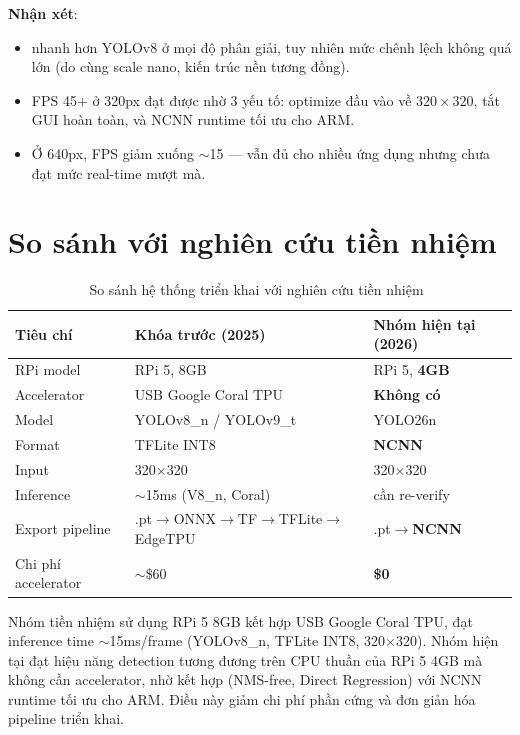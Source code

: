 \textbf{Nhận xét}: 
\begin{itemize}
    \item \yolo nhanh hơn YOLOv8 ở mọi độ phân giải, tuy nhiên mức chênh lệch không quá lớn (do cùng scale nano, kiến trúc nền tương đồng).
    \item FPS 45+ ở 320px đạt được nhờ 3 yếu tố: optimize đầu vào về $320 \times 320$, tắt GUI hoàn toàn, và NCNN runtime tối ưu cho ARM.
    \item Ở 640px, FPS giảm xuống $\sim$15 --- vẫn đủ cho nhiều ứng dụng nhưng chưa đạt mức real-time mượt mà.
\end{itemize}

\section{So sánh với nghiên cứu tiền nhiệm}
\label{sec:deploy_comparison}

\begin{table}[H]
    \centering
    \caption{So sánh hệ thống triển khai với nghiên cứu tiền nhiệm~\cite{kltn_tiennhiem}}
    \label{tab:comparison_prev}
    \small
    \begin{tabularx}{\textwidth}{lXX}
        \toprule
        \textbf{Tiêu chí} & \textbf{Khóa trước (2025)} & \textbf{Nhóm hiện tại (2026)} \\
        \midrule
        RPi model       & RPi 5, 8GB             & RPi 5, \textbf{4GB} \\
        Accelerator     & USB Google Coral TPU   & \textbf{Không có} \\
        Model           & YOLOv8\_n / YOLOv9\_t  & YOLO26n \\
        Format          & TFLite INT8            & \textbf{NCNN} \\
        Input           & 320$\times$320         & 320$\times$320 \\
        Inference       & $\sim$15ms (V8\_n, Coral) & cần re-verify \\
        Export pipeline & .pt$\to$ONNX$\to$TF$\to$TFLite$\to$EdgeTPU & .pt$\to$\textbf{NCNN} \\
        Chi phí accelerator & $\sim$\$60         & \textbf{\$0} \\
        \bottomrule
    \end{tabularx}
\end{table}

Nhóm tiền nhiệm sử dụng RPi 5 8GB kết hợp USB Google Coral TPU, đạt inference time $\sim$15ms/frame (YOLOv8\_n, TFLite INT8, 320$\times$320). Nhóm hiện tại đạt hiệu năng detection tương đương trên CPU thuần của RPi 5 4GB mà không cần accelerator, nhờ kết hợp \yolo (NMS-free, Direct Regression) với NCNN runtime tối ưu cho ARM. Điều này giảm chi phí phần cứng và đơn giản hóa pipeline triển khai.

